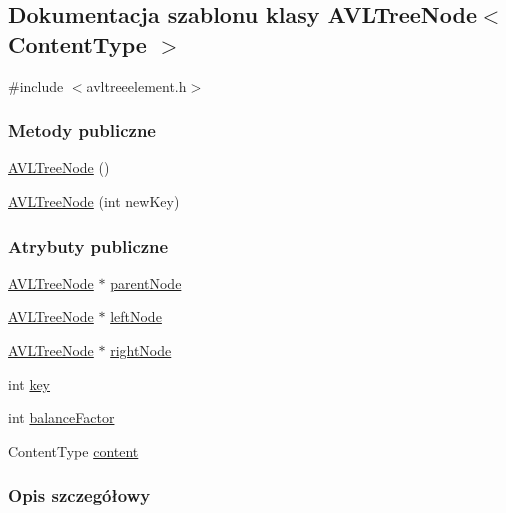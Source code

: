 \hypertarget{class_a_v_l_tree_node}{\subsection{Dokumentacja szablonu klasy A\-V\-L\-Tree\-Node$<$ Content\-Type $>$}
\label{class_a_v_l_tree_node}
}


{\ttfamily \#include $<$avltreeelement.\-h$>$}

\subsubsection*{Metody publiczne}
\begin{DoxyCompactItemize}
\item 
\hyperlink{class_a_v_l_tree_node_ae79b3a933b8290bf12d87242dec5deea}{A\-V\-L\-Tree\-Node} ()
\item 
\hyperlink{class_a_v_l_tree_node_a3145d578d5da384c424484ddfa9095ba}{A\-V\-L\-Tree\-Node} (int new\-Key)
\end{DoxyCompactItemize}
\subsubsection*{Atrybuty publiczne}
\begin{DoxyCompactItemize}
\item 
\hyperlink{class_a_v_l_tree_node}{A\-V\-L\-Tree\-Node} $\ast$ \hyperlink{class_a_v_l_tree_node_ae64d1261fea217d3e85928e7cf2a9151}{parent\-Node}
\item 
\hyperlink{class_a_v_l_tree_node}{A\-V\-L\-Tree\-Node} $\ast$ \hyperlink{class_a_v_l_tree_node_afc53d4774f375c23795c9eb598f4d7cd}{left\-Node}
\item 
\hyperlink{class_a_v_l_tree_node}{A\-V\-L\-Tree\-Node} $\ast$ \hyperlink{class_a_v_l_tree_node_a51dfb148f27625c89a3a153760517c38}{right\-Node}
\item 
int \hyperlink{class_a_v_l_tree_node_a717c2f6c33504a065570802e95189a57}{key}
\item 
int \hyperlink{class_a_v_l_tree_node_a212c57dab467b42c3ddc50b2aecc05ad}{balance\-Factor}
\item 
Content\-Type \hyperlink{class_a_v_l_tree_node_ac94089c8fd88ff9fbd092cd2306719bd}{content}
\end{DoxyCompactItemize}


\subsubsection{Opis szczegółowy}
